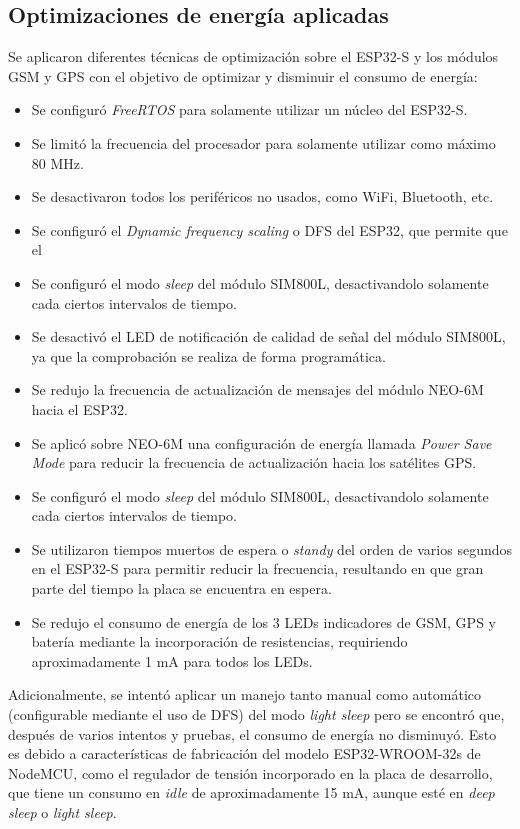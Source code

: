 {\subsection{Optimizaciones de energía aplicadas}

Se aplicaron diferentes técnicas de optimización sobre el ESP32-S y los módulos GSM y GPS con el objetivo de optimizar y disminuir el consumo de energía:
\begin{itemize}
	\item Se configuró \textit{FreeRTOS} para solamente utilizar un núcleo del ESP32-S.
	\item Se limitó la frecuencia del procesador para solamente utilizar como máximo 80 MHz.
	\item Se desactivaron todos los periféricos no usados, como WiFi, Bluetooth, etc.
	\item Se configuró el \textit{Dynamic frequency scaling} o DFS del ESP32, que permite que el 
	\item Se configuró el modo \textit{sleep} del módulo SIM800L, desactivandolo solamente cada ciertos intervalos de tiempo.
	\item Se desactivó el LED de notificación de calidad de señal del módulo SIM800L, ya que la comprobación se realiza de forma programática.
	\item Se redujo la frecuencia de actualización de mensajes del módulo NEO-6M hacia el ESP32.
	\item Se aplicó sobre NEO-6M una configuración de energía llamada \textit{Power Save Mode} para reducir la frecuencia de actualización hacia los satélites GPS.
	\item Se configuró el modo \textit{sleep} del módulo SIM800L, desactivandolo solamente cada ciertos intervalos de tiempo.
	\item Se utilizaron tiempos muertos de espera o \textit{standy} del orden de varios segundos en el ESP32-S para permitir reducir la frecuencia, resultando en que gran parte del tiempo la placa se encuentra en espera.
	\item Se redujo el consumo de energía de los 3 LEDs indicadores de GSM, GPS y batería mediante la incorporación de resistencias, requiriendo aproximadamente 1 mA para todos los LEDs.
\end{itemize}

Adicionalmente, se intentó aplicar un manejo tanto manual como automático (configurable mediante el uso de DFS) del modo \textit{light sleep} pero se encontró que, después de varios intentos y pruebas, el consumo de energía no disminuyó. Esto es debido a características de fabricación del modelo ESP32-WROOM-32s de NodeMCU, como el regulador de tensión incorporado en la placa de desarrollo, que tiene un consumo en \textit{idle} de aproximadamente 15 mA, aunque esté en \textit{deep sleep} o \textit{light sleep}.

}
